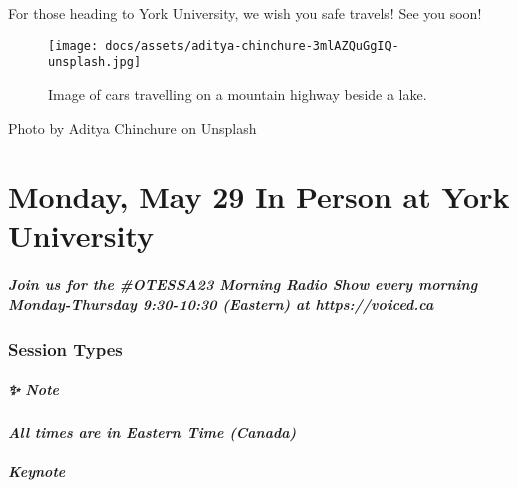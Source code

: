 \documentclass[
]{book}
\begin{document}
For those heading to York University, we wish you safe travels! See you soon!

\begin{figure}
\centering
\texttt{[image: docs/assets/aditya-chinchure-3mlAZQuGgIQ-unsplash.jpg]}
\caption{Image of cars travelling on a mountain highway beside a lake.}
\end{figure}

Photo by Aditya Chinchure on Unsplash

\hypertarget{monday-may-29-in-person-at-york-university}{%
\chapter{Monday, May 29 \textbar{} In Person at York University}\label{monday-may-29-in-person-at-york-university}}

\begin{protip}
\hypertarget{join-us-for-the-otessa23-morning-radio-show-every-morning-monday-thursday-930-1030-eastern-at-httpsvoiced.ca}{%
\paragraph{Join us for the \#OTESSA23 Morning Radio Show every morning
Monday-Thursday 9:30-10:30 (Eastern) at
https://voiced.ca}\label{join-us-for-the-otessa23-morning-radio-show-every-morning-monday-thursday-930-1030-eastern-at-httpsvoiced.ca}}
\end{protip}

\hypertarget{session-types-1}{%
\subsection*{Session Types}\label{session-types-1}}

\begin{protip}
\hypertarget{note}{%
\paragraph*{✨ Note}\label{note}}

\textbf{\emph{All times are in Eastern Time (Canada)}}
\end{protip}

\begin{keynote}
\hypertarget{keynote}{%
\paragraph{Keynote}\label{keynote}}
\end{keynote}
\end{document}

